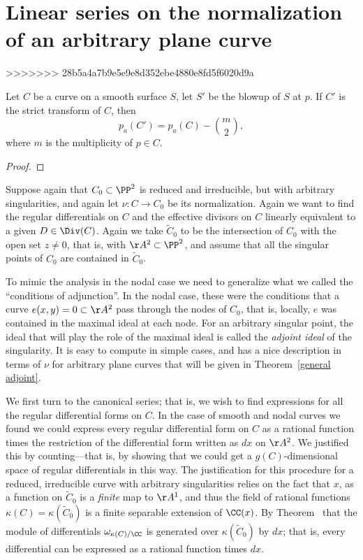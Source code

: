 \section{Linear series on the normalization of an arbitrary plane curve} \label{arbitrary plane curves}

>>>>>>> 28b5a4a7b9e5e9e8d352ebe4880e8fd5f6020d9a
\begin{proposition}\label{effect of blowup on genus}
 Let $C$ be a curve on a smooth surface $S$, let $S'$ be the blowup of $S$ at $p$. If $C'$ is the strict transform of $C$, then
 $$
 p_a(C') = p_a(C) -{m\choose 2},
 $$
 where $m$ is the multiplicity of $p\in C$.
\end{proposition}
\begin{proof}
\end{proof}

Suppose again that $C_0 \subset \PP^2$ is reduced and irreducible, but with arbitrary singularities, and again let $\nu : C \to C_0$ be its normalization. Again we want to find the regular differentials on $C$ and the effective divisors on $C$ linearly equivalent to a given $D \in \Div(C)$. Again we take $\widetilde C_0$ to be the intersection of $C_0$ with the open set $z \neq 0$, that is, with $\AA^2\subset \PP^2$, and assume that
all the singular points of $C_0$ are contained in $\widetilde C_0$.

To mimic the analysis in the nodal case we need to generalize what we called the ``conditions of adjunction''. In the nodal case, these were the conditions that a curve $e(x,y)=0 \subset \AA^2$ pass through the nodes of $C_0$, that is, locally, $e$ was contained in the maximal ideal
at each node. For an arbitrary singular point, the ideal that will play the role of the maximal ideal is called the \emph{adjoint ideal} of the singularity. It is easy to compute in simple cases, and has a nice description in terms of $\nu$ for arbitrary plane curves that will be given in Theorem~\ref{general adjoint}.

We first turn to the canonical series; that is, we wish to find expressions for all the regular differential forms on $C$. In the case of smooth and nodal curves we found we could express every regular differential form
on $C$ as a rational function times the restriction of the differential form written as $dx$ on $\AA^2$. We justified this
by counting---that is, by showing that we could get a $g(C)$-dimensional space of regular differentials in this way. The justification for 
this procedure for a reduced, irreducible curve with arbitrary singularities relies on the fact that $x$, as a function on $\widetilde C_0$
is a \emph{finite} map to $\AA^1$, and thus the field of rational functions $\kappa(C) = \kappa(\widetilde C_0)$ is a finite
separable extension of $\CC(x)$. By Theorem~\cite[****]{Eisenbud1995} that the module of differentials 
$\omega_{\kappa(C)/\CC}$ is generated over $\kappa(\widetilde C_0)$ by $dx$; that is, every differential can be expressed as a rational function
times $dx$. 

